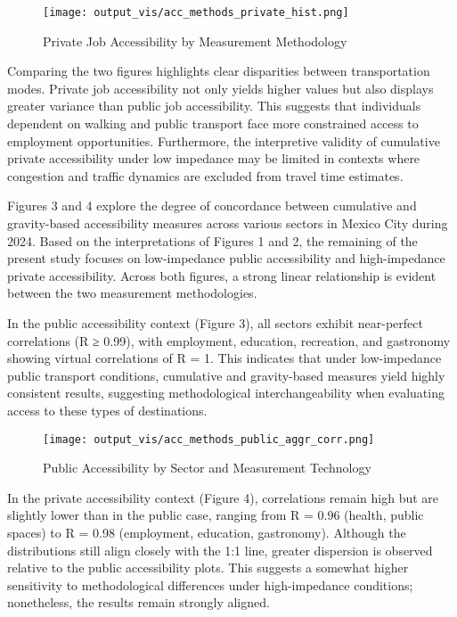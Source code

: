 \documentclass[
  12pt,
]{report}
\begin{document}
\begin{figure}[H]

{\centering \texttt{[image: output\_vis/acc\_methods\_private\_hist.png]}

}

\caption{Private Job Accessibility by Measurement Methodology}

\end{figure}%

Comparing the two figures highlights clear disparities between
transportation modes. Private job accessibility not only yields higher
values but also displays greater variance than public job accessibility.
This suggests that individuals dependent on walking and public transport
face more constrained access to employment opportunities. Furthermore,
the interpretive validity of cumulative private accessibility under low
impedance may be limited in contexts where congestion and traffic
dynamics are excluded from travel time estimates.

Figures 3 and 4 explore the degree of concordance between cumulative and
gravity-based accessibility measures across various sectors in Mexico
City during 2024. Based on the interpretations of Figures 1 and 2, the
remaining of the present study focuses on low-impedance public
accessibility and high-impedance private accessibility. Across both
figures, a strong linear relationship is evident between the two
measurement methodologies.

In the public accessibility context (Figure 3), all sectors exhibit
near-perfect correlations (R ≥ 0.99), with employment, education,
recreation, and gastronomy showing virtual correlations of R = 1. This
indicates that under low-impedance public transport conditions,
cumulative and gravity-based measures yield highly consistent results,
suggesting methodological interchangeability when evaluating access to
these types of destinations.

\begin{figure}[H]

{\centering \texttt{[image: output\_vis/acc\_methods\_public\_aggr\_corr.png]}

}

\caption{Public Accessibility by Sector and Measurement Technology}

\end{figure}%

In the private accessibility context (Figure 4), correlations remain
high but are slightly lower than in the public case, ranging from R =
0.96 (health, public spaces) to R = 0.98 (employment, education,
gastronomy). Although the distributions still align closely with the 1:1
line, greater dispersion is observed relative to the public
accessibility plots. This suggests a somewhat higher sensitivity to
methodological differences under high-impedance conditions; nonetheless,
the results remain strongly aligned.
\end{document}
